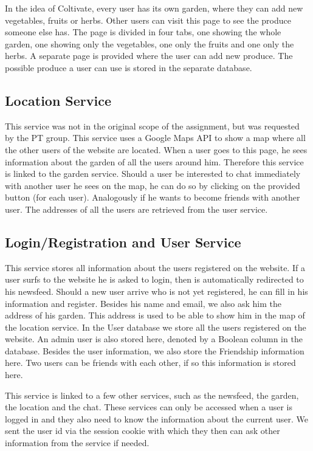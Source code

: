 \documentclass[a4paper,12pt]{article}
\begin{document}
In the idea of Coltivate, every user has its own garden, where they can add new vegetables, fruits or herbs. Other users can visit this page to see the produce someone else has. The page is divided in four tabs, one showing the whole garden, one showing only the vegetables, one only the fruits and one only the herbs. A separate page is provided where the user can add new produce. The possible produce a user can use is stored in the separate database.

\subsection{Location Service}

This service was not in the original scope of the assignment, but was requested by the PT group. This service uses a Google Maps API to show a map where all the other users of the website are located. When a user goes to this page, he sees information about the garden of all the users around him. Therefore this service is linked to the garden service. Should a user be interested to chat immediately with another user he sees on the map, he can do so by clicking on the provided button (for each user). Analogously if he wants to become friends with another user. The addresses of all the users are retrieved from the user service.

\subsection{Login/Registration and User Service}

This service stores all information about the users registered on the website. If a user surfs to the website he is asked to login, then is automatically redirected to his newsfeed. Should a new user arrive who is not yet registered, he can fill in his information and register. Besides his name and email, we also ask him the address of his garden. This address is used to be able to show him in the map of the location service. In the User database we store all the users registered on the website. An admin user is also stored here, denoted by a Boolean column in the database. Besides the user information, we also store the Friendship information here. Two users can be friends with each other, if so this information is stored here.
\newline

This service is linked to a few other services, such as the newsfeed, the garden, the location and the chat. These services can only be accessed when a user is logged in and they also need to know the information about the current user. We sent the user id via the session cookie with which they then can ask other information from the service if needed. 
\end{document}
